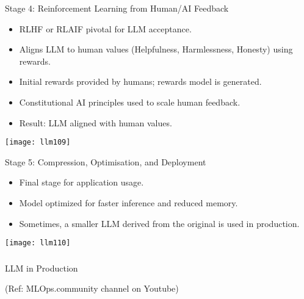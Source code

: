 \begin{frame}[fragile]{Stage 4: Reinforcement Learning from Human/AI Feedback}
    \begin{itemize}
        \item RLHF or RLAIF pivotal for LLM acceptance.
        \item Aligns LLM to human values (Helpfulness, Harmlessness, Honesty) using rewards.
        \item Initial rewards provided by humans; rewards model is generated.
        \item Constitutional AI principles used to scale human feedback.
        \item Result: LLM aligned with human values.
    \end{itemize}
	
		\begin{center}
		\texttt{[image: llm109]}
		\end{center}	
\end{frame}

\begin{frame}[fragile]{Stage 5: Compression, Optimisation, and Deployment}
    \begin{itemize}
        \item Final stage for application usage.
        \item Model optimized for faster inference and reduced memory.
        \item Sometimes, a smaller LLM derived from the original is used in production.
    \end{itemize}
	
		\begin{center}
		\texttt{[image: llm110]}
		\end{center}		
\end{frame}


\begin{frame}[fragile]\frametitle{}
\begin{center}
{\Large LLM in Production}

{\tiny (Ref: MLOps.community channel on Youtube)}

\end{center}
\end{frame}



